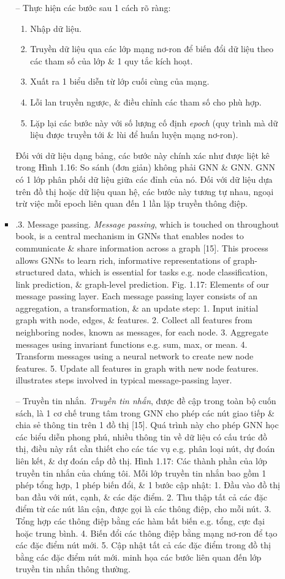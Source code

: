 \documentclass{article}
\begin{document}
\begin{itemize}
\begin{itemize}
\begin{itemize}
            -- Thực hiện các bước sau 1 cách rõ ràng:
            \begin{enumerate}
                \item Nhập dữ liệu.
                \item Truyền dữ liệu qua các lớp mạng nơ-ron để biến đổi dữ liệu theo các tham số của lớp \& 1 quy tắc kích hoạt.
                \item Xuất ra 1 biểu diễn từ lớp cuối cùng của mạng.
                \item Lỗi lan truyền ngược, \& điều chỉnh các tham số cho phù hợp.
                \item Lặp lại các bước này với số lượng cố định {\it epoch} (quy trình mà dữ liệu được truyền tới \& lùi để huấn luyện mạng nơ-ron).
            \end{enumerate}
            Đối với dữ liệu dạng bảng, các bước này chính xác như được liệt kê trong {\sf Hình 1.16: So sánh (đơn giản) không phải GNN \& GNN. GNN có 1 lớp phân phối dữ liệu giữa các đỉnh của nó.} Đối với dữ liệu dựa trên đồ thị hoặc dữ liệu quan hệ, các bước này tương tự nhau, ngoại trừ việc mỗi epoch liên quan đến 1 lần lặp truyền thông điệp.
            \item {.3. Message passing.} {\it Message passing}, which is touched on throughout book, is a central mechanism in GNNs that enables nodes to communicate \& share information across a graph [15]. This process allows GNNs to learn rich, informative representations of graph-structured data, which is essential for tasks e.g. node classification, link prediction, \& graph-level prediction. {\sf Fig. 1.17: Elements of our message passing layer. Each message passing layer consists of an aggregation, a transformation, \& an update step: 1. Input initial graph with node, edges, \& features. 2. Collect all features from neighboring nodes, known as messages, for each node. 3. Aggregate messages using invariant functions e.g. sum, max, or mean. 4. Transform messages using a neural network to create new node features. 5. Update all features in graph with new node features.} illustrates steps involved in typical message-passing layer.

            -- {\sf Truyền tin nhắn.} {\it Truyền tin nhắn}, được đề cập trong toàn bộ cuốn sách, là 1 cơ chế trung tâm trong GNN cho phép các nút giao tiếp \& chia sẻ thông tin trên 1 đồ thị [15]. Quá trình này cho phép GNN học các biểu diễn phong phú, nhiều thông tin về dữ liệu có cấu trúc đồ thị, điều này rất cần thiết cho các tác vụ e.g. phân loại nút, dự đoán liên kết, \& dự đoán cấp đồ thị. {\sf Hình 1.17: Các thành phần của lớp truyền tin nhắn của chúng tôi. Mỗi lớp truyền tin nhắn bao gồm 1 phép tổng hợp, 1 phép biến đổi, \& 1 bước cập nhật: 1. Đầu vào đồ thị ban đầu với nút, cạnh, \& các đặc điểm. 2. Thu thập tất cả các đặc điểm từ các nút lân cận, được gọi là các thông điệp, cho mỗi nút. 3. Tổng hợp các thông điệp bằng các hàm bất biến e.g. tổng, cực đại hoặc trung bình. 4. Biến đổi các thông điệp bằng mạng nơ-ron để tạo các đặc điểm nút mới. 5. Cập nhật tất cả các đặc điểm trong đồ thị bằng các đặc điểm nút mới.} minh họa các bước liên quan đến lớp truyền tin nhắn thông thường.


\end{itemize}
\end{itemize}
\end{itemize}
\end{document}
